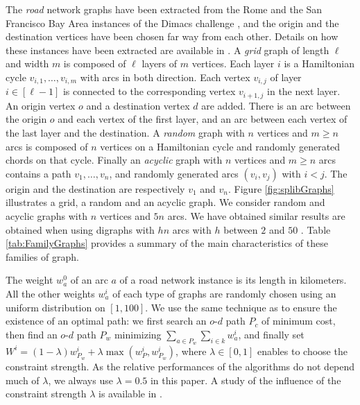 \documentclass[11pt]{amsart}
\theoremstyle{plain}
\theoremstyle{remark}
\begin{document}
The \emph{road} network graphs have been extracted from the Rome and the San Francisco Bay Area instances of the Dimacs challenge \cite{dimacsChallenge}, and the origin and the destination vertices have been chosen far way from each other. Details on how these instances have been extracted are available in \cite{parmentier2016thesis}. A \emph{grid} graph of length $\ell$ and width $m$ is composed of $\ell$ layers of $m$ vertices. Each layer $i$ is a Hamiltonian cycle $v_{i,1},\ldots, v_{i,m}$ with arcs in both direction. Each vertex $v_{i,j}$ of layer $i\in[\ell - 1]$ is connected to the corresponding vertex $v_{i+1,j}$ in the next layer. An origin vertex $o$ and a destination vertex $d$ are added. There is an arc between the origin $o$ and each vertex of the first layer, and an arc between each vertex of the last layer and the destination. A \emph{random} graph with $n$ vertices and $m \geq n$ arcs is composed of $n$ vertices on a Hamiltonian cycle and randomly generated chords on that cycle. Finally an \emph{acyclic} graph with $n$ vertices and $m\geq n$ arcs contains a path $v_{1}, \ldots, v_{n}$, and randomly generated arcs $(v_{i},v_{j})$ with $i<j$. The origin and the destination are respectively $v_{1}$ and $v_{n}$. Figure \ref{fig:splibGraphs} illustrates a grid, a random and an acyclic graph. We consider random and acyclic graphs with $n$ vertices and $5n$ arcs. We have obtained similar results are obtained when using digraphs with $hn$ arcs with $h$ between $2$ and $50$ \cite{parmentier2016thesis}. Table \ref{tab:FamilyGraphs} provides a summary of the main characteristics of these families of graph.

The weight $w_{a}^{0}$ of an arc $a$ of a road network instance is its length in kilometers. All the other weights $w_{a}^{i}$ of each type of graphs are randomly chosen using an uniform distribution on $[1,100]$. We use the same technique as \cite{dumitrescu2003improved} to ensure the existence of an optimal path: we first search an $o$-$d$ path $P_{c}$ of minimum cost, then find an $o$-$d$ path $P_{w}$ minimizing $\displaystyle\sum_{a \in P_{w}}\sum_{i \in k} w_{a}^{i}$, and finally set $ W^{i} = (1- \lambda) w_{P_{w}}^{i} + \lambda \max(w_{P}^{i},w_{P_{w}}^{i})$, where $\lambda\in[0,1]$ enables to choose the constraint strength. As the relative performances of the algorithms do not depend much of $\lambda$, we always use $\lambda = 0.5$ in this paper. A study of the influence of the constraint strength $\lambda$ is available in \cite{parmentier2016thesis}.
\end{document}

